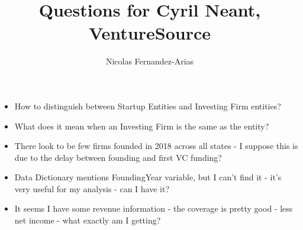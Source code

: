 \documentclass[12pt,english]{article}
\theoremstyle{remark}
\begin{document}
	
\title{Questions for Cyril Neant, VentureSource}
\author{Nicolas Fernandez-Arias}
\maketitle

\begin{itemize}
	\item How to distinguish between Startup Entities and Investing Firm entities?
	\item What does it mean when an Investing Firm is the same as the entity?
	\item There look to be few firms founded in 2018 across all states - I suppose this is due to the delay between founding and first VC funding?
	\item Data Dictionary mentions FoundingYear variable, but I can't find it - it's very useful for my analysis - can I have it?
	\item It seems I have some revenue information - the coverage is pretty good - less net income - what exactly am I getting?
\end{itemize}
\end{document}
